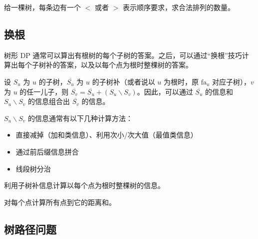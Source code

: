 \begin{example}[{[HEOI2013] SAO}]
    给一棵树，每条边有一个 $<$ 或者 $>$ 表示顺序要求，求合法排列的数量。
\end{example}

\subsection{换根}

树形 DP 通常可以算出有根树的每个子树的答案。之后，可以通过“换根”技巧计算出每个子树补的答案，以及以每个点为根时整棵树的答案。

\begin{example}[子树补]
    设 $S_u$ 为 $u$ 的子树，$\overline{S_u}$ 为 $u$ 的子树补（或者说以 $u$ 为根时，原 $\mathrm{fa}_u$ 对应子树），$v$ 为 $u$ 的任一儿子，则 $\overline{S_v}=\overline{S_u}+(S_u\backslash  S_v)$。因此，可以通过 $\overline{S_u}$ 的信息和 $S_u\backslash S_v$ 的信息组合出 $\overline{S_v}$ 的信息。

    $S_u\backslash S_v$ 的信息通常有以下几种计算方法：
    \begin{itemize}
        \item 直接减掉（加和类信息）、利用次小/次大值（最值类信息）
        \item 通过前后缀信息拼合
        \item 线段树分治
    \end{itemize}
\end{example}

\begin{exercise}
    利用子树补信息计算以每个点为根时整棵树的信息。
\end{exercise}

\begin{exercise}
   对每个点计算所有点到它的距离和。 
\end{exercise}

\begin{exercise}
    
\end{exercise}

\begin{exercise}
    
\end{exercise}

\subsection{树路径问题}

